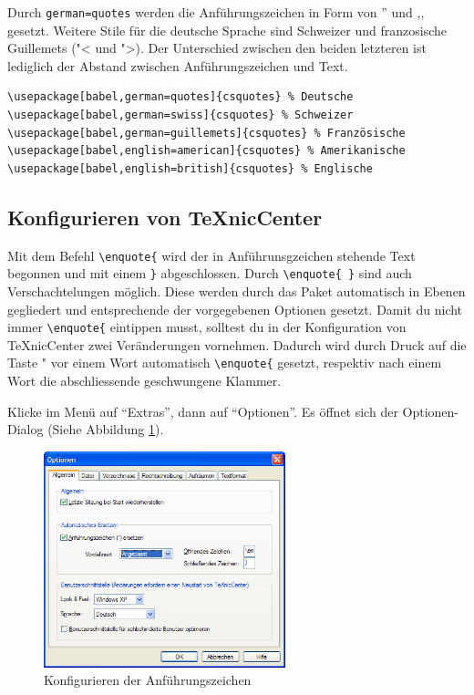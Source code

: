 Durch \verb|german=quotes| werden die Anführungszeichen in Form von '' und ,, gesetzt. Weitere Stile für die deutsche Sprache sind Schweizer und franzosische Guillemets ("< und ">). Der Unterschied zwischen den beiden letzteren ist lediglich der Abstand zwischen Anführungszeichen und Text.

\begin{lstlisting}[caption={Häufig verwendete \enquote{csquotes} Optionen.},label=lst:csquotesoptions,frame=tb]
\usepackage[babel,german=quotes]{csquotes} % Deutsche
\usepackage[babel,german=swiss]{csquotes} % Schweizer
\usepackage[babel,german=guillemets]{csquotes} % Französische
\usepackage[babel,english=american]{csquotes} % Amerikanische
\usepackage[babel,english=british]{csquotes} % Englische
\end{lstlisting}


\subsection{Konfigurieren von TeXnicCenter}

Mit dem Befehl \verb|\enquote{| wird der in Anführunsgzeichen stehende Text begonnen und mit einem \verb|}| abgeschlossen. Durch \verb|\enquote{ }| sind auch Verschachtelungen möglich. Diese werden durch das Paket automatisch in Ebenen gegliedert und entsprechende der vorgegebenen Optionen gesetzt. Damit du nicht immer \verb|\enquote{| eintippen musst, solltest du in der Konfiguration von TeXnicCenter zwei Veränderungen vornehmen. Dadurch wird durch Druck auf die Taste "{} vor einem Wort automatisch \verb|\enquote{| gesetzt, respektiv nach einem Wort die abschliessende geschwungene Klammer.

Klicke im Menü auf \enquote{Extras}, dann auf \enquote{Optionen}. Es öffnet sich der Optionen-Dialog (Siehe Abbildung \ref{fig:konfiguration05}).

\begin{figure}
	\begin{center}
		\includegraphics[width=7cm]{images/konfiguration05.png}
		\caption{Konfigurieren der Anführungszeichen}
		\label{fig:konfiguration05}
	\end{center}
\end{figure}

